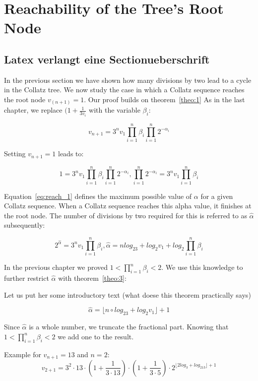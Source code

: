 \chapter{Reachability of the Tree's Root Node}

\section{Latex verlangt eine Sectionueberschrift}
In the previous section we have shown how many divisions by two lead to a cycle in the Collatz tree. We now study the case in which a Collatz sequence reaches the root node $v_(n+1)=1$. Our proof builds on theorem~\ref{theo:1} As in the last chapter, we replace $(1+\frac{1}{3v_i}$ with the variable $\beta_i$:

\[
v_{n+1}=3^nv_1\prod_{i=1}^{n}\beta_i\prod_{i=1}^{n}2^{-\alpha_i}
\]

Setting $v_{n+1}=1$ leads to:

\begin{equation}
\label{eq:reach_1}
1=3^nv_1\prod_{i=1}^{n}\beta_i\prod_{i=1}^{n}2^{-\alpha_i}, \prod_{i=1}^{n}2^{-\alpha_i}=3^nv_1\prod_{i=1}^{n}\beta_i
\end{equation}

Equation~\ref{eq:reach_1} defines the maximum possible value of $\alpha$ for a given Collatz sequence. When a Collatz sequence reaches this alpha value, it finishes at the root node. The number of divisions by two required for this is referred to as $\hat\alpha$ subsequently:

\[
2^{\hat\alpha}=3^nv_1\prod_{i=1}^{n}\beta_i,
\hat\alpha=nlog_23+log_2v_1+log_2\prod_{i=1}^{n}\beta_i
\]

In the previous chapter we proved $1<\prod_{i=1}^{n}\beta_i<2$. We use this knowledge to further restrict $\hat\alpha$ with theorem~\ref{theo:3}:

\bigskip
\begin{theorem}
\label{theo:3}
Let us put her some introductory text (what doese this theorem practically says)

\[
\hat\alpha=\lfloor n\circ log_23+log_2v_1\rfloor+1
\]
\end{theorem}

\par\medskip
Since $\hat\alpha$ is a whole number, we truncate the fractional part. Knowing that $1<\prod_{i=1}^{n}\beta_i<2$ we add one to the result.

\bigskip
\begin{example}
Example for $v_{n+1}=13$ and $n=2$:
\[
v_{2+1}=3^2\cdot13\cdot\left(1+\frac{1}{3\cdot13}\right)\cdot\left(1+\frac{1}{3\cdot5}\right)\cdot2^{\lfloor2log_3+log_213\rfloor+1}
\]
\end{example}

